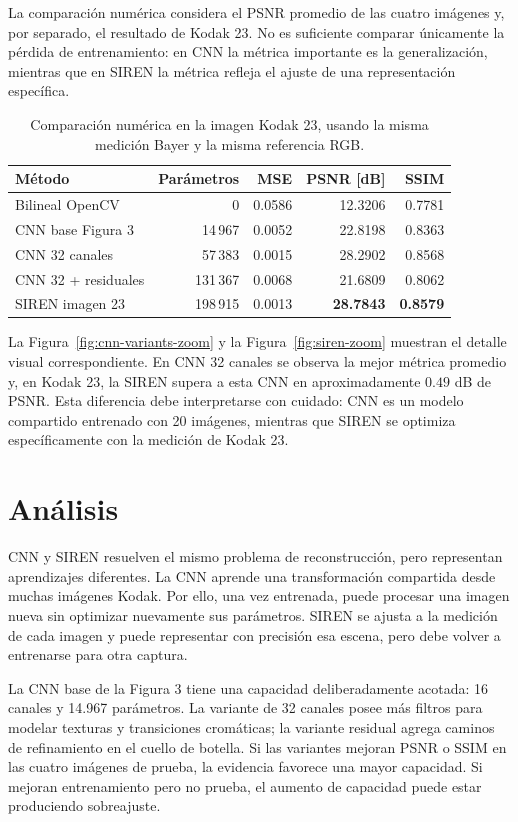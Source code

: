 \documentclass[11pt,a4paper]{article}
\begin{document}
La comparación numérica considera el PSNR promedio de las cuatro imágenes y, por separado, el resultado de Kodak 23. No es suficiente comparar únicamente la pérdida de entrenamiento: en CNN la métrica importante es la generalización, mientras que en SIREN la métrica refleja el ajuste de una representación específica.

\begin{table}[H]
\centering
\caption{Comparación numérica en la imagen Kodak 23, usando la misma medición Bayer y la misma referencia RGB.}
\label{tab:cnn-siren-kodak23}
\scriptsize
\begin{tabular}{p{6.0cm}rrrr}
\toprule
Método & Parámetros & MSE & PSNR [dB] & SSIM\\
\midrule
Bilineal OpenCV & 0 & 0.0586 & 12.3206 & 0.7781\\
CNN base Figura 3 & 14\,967 & 0.0052 & 22.8198 & 0.8363\\
CNN 32 canales & 57\,383 & 0.0015 & 28.2902 & 0.8568\\
CNN 32 + residuales & 131\,367 & 0.0068 & 21.6809 & 0.8062\\
SIREN imagen 23 & 198\,915 & 0.0013 & \textbf{28.7843} & \textbf{0.8579}\\
\bottomrule
\end{tabular}
\end{table}

La Figura~\ref{fig:cnn-variants-zoom} y la Figura~\ref{fig:siren-zoom} muestran el detalle visual correspondiente. En CNN 32 canales se observa la mejor métrica promedio y, en Kodak 23, la SIREN supera a esta CNN en aproximadamente $0.49$ dB de PSNR. Esta diferencia debe interpretarse con cuidado: CNN es un modelo compartido entrenado con 20 imágenes, mientras que SIREN se optimiza específicamente con la medición de Kodak 23.

\section{Análisis}

CNN y SIREN resuelven el mismo problema de reconstrucción, pero representan aprendizajes diferentes. La CNN aprende una transformación compartida desde muchas imágenes Kodak. Por ello, una vez entrenada, puede procesar una imagen nueva sin optimizar nuevamente sus parámetros. SIREN se ajusta a la medición de cada imagen y puede representar con precisión esa escena, pero debe volver a entrenarse para otra captura.

La CNN base de la Figura 3 tiene una capacidad deliberadamente acotada: 16 canales y 14.967 parámetros. La variante de 32 canales posee más filtros para modelar texturas y transiciones cromáticas; la variante residual agrega caminos de refinamiento en el cuello de botella. Si las variantes mejoran PSNR o SSIM en las cuatro imágenes de prueba, la evidencia favorece una mayor capacidad. Si mejoran entrenamiento pero no prueba, el aumento de capacidad puede estar produciendo sobreajuste.
\end{document}
